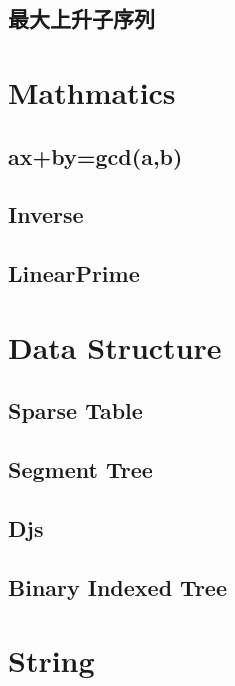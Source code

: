 \subsection{最大上升子序列}



\section{Mathmatics}

\subsection{ax+by=gcd(a,b)}

\subsection{Inverse}

\subsection{LinearPrime}




\section{Data Structure}

\subsection{Sparse Table}

\subsection{Segment Tree}

\subsection{Djs}

\subsection{Binary Indexed Tree}



\section{String}

